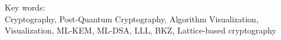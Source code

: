 \vspace*{0.2cm}

\noindent Key words: \\ Cryptography, Post-Quantum Cryptography, Algorithm Visualization, Visualization, ML-KEM, ML-DSA, LLL, BKZ, Lattice-based cryptography \\

\newpage
